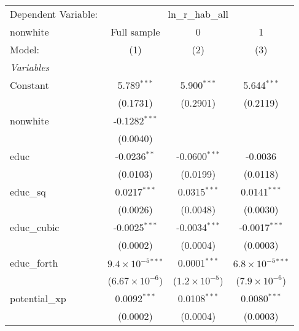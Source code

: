 
\begingroup
\centering
\begin{tabular}{lccc}
   \tabularnewline \midrule \midrule
   Dependent Variable: & \multicolumn{3}{c}{ln\_r\_hab\_all}\\
   nonwhite                        & Full sample                  & 0                      & 1 \\   
   Model:                          & (1)                          & (2)                    & (3)\\  
   \midrule
   \emph{Variables}\\
   Constant                        & 5.789$^{***}$                & 5.900$^{***}$          & 5.644$^{***}$\\   
                                   & (0.1731)                     & (0.2901)               & (0.2119)\\   
   nonwhite                        & -0.1282$^{***}$              &                        &   \\   
                                   & (0.0040)                     &                        &   \\   
   educ                            & -0.0236$^{**}$               & -0.0600$^{***}$        & -0.0036\\   
                                   & (0.0103)                     & (0.0199)               & (0.0118)\\   
   educ\_sq                        & 0.0217$^{***}$               & 0.0315$^{***}$         & 0.0141$^{***}$\\   
                                   & (0.0026)                     & (0.0048)               & (0.0030)\\   
   educ\_cubic                     & -0.0025$^{***}$              & -0.0034$^{***}$        & -0.0017$^{***}$\\   
                                   & (0.0002)                     & (0.0004)               & (0.0003)\\   
   educ\_forth                     & $9.4\times 10^{-5}$$^{***}$  & 0.0001$^{***}$         & $6.8\times 10^{-5}$$^{***}$\\    
                                   & ($6.67\times 10^{-6}$)       & ($1.2\times 10^{-5}$)  & ($7.9\times 10^{-6}$)\\    
   potential\_xp                   & 0.0092$^{***}$               & 0.0108$^{***}$         & 0.0080$^{***}$\\   
                                   & (0.0002)                     & (0.0004)               & (0.0003)\\   

\end{tabular}
